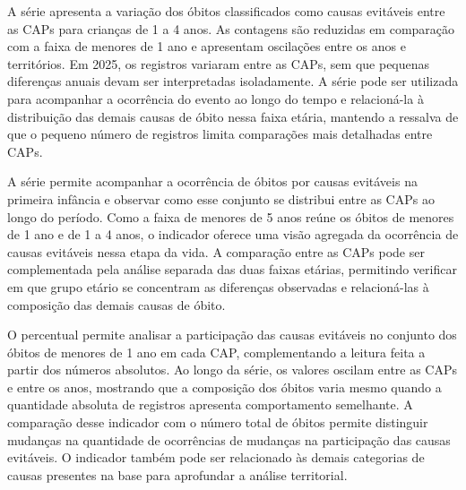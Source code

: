 
A série apresenta a variação dos óbitos classificados como causas evitáveis entre as CAPs para crianças de 1 a 4 anos. As contagens são reduzidas em comparação com a faixa de menores de 1 ano e apresentam oscilações entre os anos e territórios. Em 2025, os registros variaram entre as CAPs, sem que pequenas diferenças anuais devam ser interpretadas isoladamente. A série pode ser utilizada para acompanhar a ocorrência do evento ao longo do tempo e relacioná-la à distribuição das demais causas de óbito nessa faixa etária, mantendo a ressalva de que o pequeno número de registros limita comparações mais detalhadas entre CAPs.


A série permite acompanhar a ocorrência de óbitos por causas evitáveis na primeira infância e observar como esse conjunto se distribui entre as CAPs ao longo do período. Como a faixa de menores de 5 anos reúne os óbitos de menores de 1 ano e de 1 a 4 anos, o indicador oferece uma visão agregada da ocorrência de causas evitáveis nessa etapa da vida. A comparação entre as CAPs pode ser complementada pela análise separada das duas faixas etárias, permitindo verificar em que grupo etário se concentram as diferenças observadas e relacioná-las à composição das demais causas de óbito.


O percentual permite analisar a participação das causas evitáveis no conjunto dos óbitos de menores de 1 ano em cada CAP, complementando a leitura feita a partir dos números absolutos. Ao longo da série, os valores oscilam entre as CAPs e entre os anos, mostrando que a composição dos óbitos varia mesmo quando a quantidade absoluta de registros apresenta comportamento semelhante. A comparação desse indicador com o número total de óbitos permite distinguir mudanças na quantidade de ocorrências de mudanças na participação das causas evitáveis. O indicador também pode ser relacionado às demais categorias de causas presentes na base para aprofundar a análise territorial.

